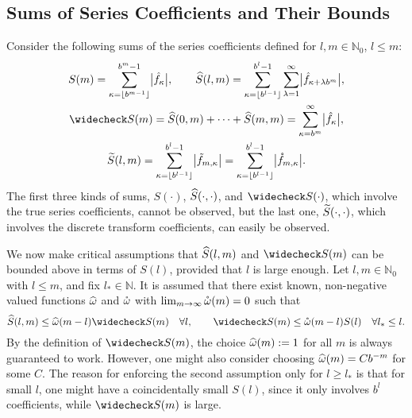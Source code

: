 \documentclass[graybox,footinfo]{svmult}
\newcommand{\N}{\mathbb{N}} %
\begin{document}
\subsection{Sums of Series Coefficients and Their Bounds}\label{sumscoeff}
Consider the following sums of the series coefficients defined for $l,m \in \N_0$, $l \le m$:
\begin{gather*}
S(m) =  \sum_{\kappa=\left \lfloor b^{m-1} \right \rfloor}^{b^{m}-1} \bigabs{\hf_{\kappa}}, \qquad
\hS(l,m)  = \sum_{\kappa=\left \lfloor b^{l-1} \right \rfloor}^{b^{l}-1} \sum_{\lambda=1}^{\infty} \bigabs{ \hf_{\kappa+\lambda b^{m}}}, \\
\wcS(m)=\hS(0,m) + \cdots + \hS(m,m)=
\sum_{\kappa=b^{m}}^{\infty} \bigabs{\hf_{\kappa}}, \\
\tS(l,m) = \sum_{\kappa=\left \lfloor b^{l-1}\right \rfloor}^{b^{l}-1} \bigabs{\tf_{m,\kappa}} = \sum_{\kappa=\left \lfloor b^{l-1}\right \rfloor}^{b^{l}-1} \bigabs{\rf_{m,\kappa}}.
\end{gather*}
The first three kinds of sums, $S(\cdot)$, $\widehat{S}(\cdot,\cdot)$, and $\wcS(\cdot)$, which involve the true series coefficients, cannot be observed, but the last one, $\widetilde{S}(\cdot, \cdot)$, which involves the discrete transform coefficients, can easily be observed.

We now make critical assumptions that $\widehat{S}(l,m)$ and $\wcS(m)$ can be bounded above in terms of $S(l)$, provided that $l$ is large enough.  Let $l,m \in \N_0$ with $l \le m$, and fix $l_* \in \N$.  It is assumed that there exist known,  non-negative valued functions $\widehat{\omega}$ and $\mathring{\omega}$ with $\lim_{m \to \infty} \mathring{\omega}(m) = 0$ such that
\begin{equation} \label{conecond}
\hS(l,m) \le \homega(m-l) \wcS(m) \quad \forall l, \qquad
\wcS(m) \le \wcomega(m-l) S(l) \quad \forall l_* \le l.
\end{equation}
By the definition of $\wcS(m)$, the choice $\widehat{\omega}(m):=1$ for all $m$ is always guaranteed to work.  However, one might also consider choosing $\widehat{\omega}(m)=C b^{-m}$ for some $C$.  The reason for enforcing the second assumption only  for $l \ge l_*$ is that for small $l$, one might have a coincidentally small $S(l)$, since it only involves $b^l$ coefficients, while $\wcS(m)$ is large.
\end{document}
